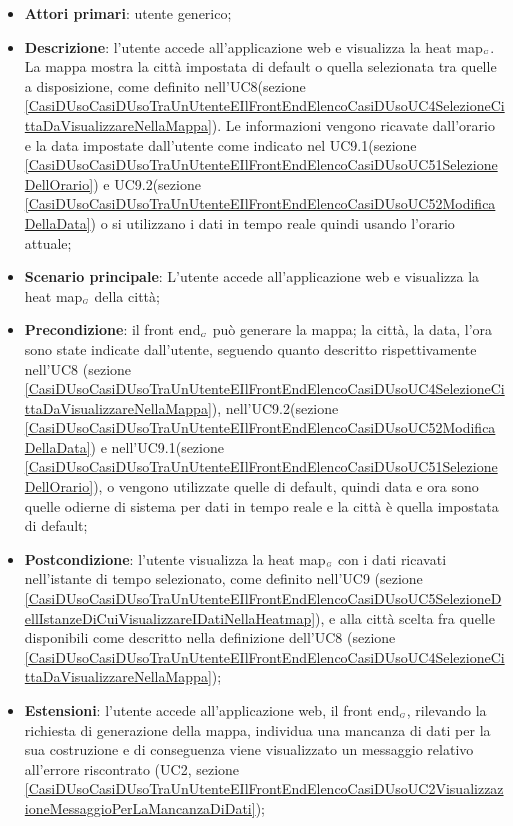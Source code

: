 \begin{itemize}
	\item \textbf{Attori primari}: utente generico;
	\item \textbf{Descrizione}: l’utente accede all’applicazione web e visualizza la heat map$_{\scaleto{G}{3pt}}$. La mappa mostra la città impostata di default o quella selezionata tra quelle a disposizione, come definito nell’UC8(sezione \ref{CasiDUsoCasiDUsoTraUnUtenteEIlFrontEndElencoCasiDUsoUC4SelezioneCittaDaVisualizzareNellaMappa}). Le informazioni vengono ricavate dall’orario e la data impostate dall’utente come indicato nel UC9.1(sezione \ref{CasiDUsoCasiDUsoTraUnUtenteEIlFrontEndElencoCasiDUsoUC51SelezioneDellOrario}) e UC9.2(sezione \ref{CasiDUsoCasiDUsoTraUnUtenteEIlFrontEndElencoCasiDUsoUC52ModificaDellaData}) o si utilizzano i dati in tempo reale quindi usando l’orario attuale;
	\item \textbf{Scenario principale}: L’utente accede all’applicazione web e visualizza la heat map$_{\scaleto{G}{3pt}}$ della città;
	\item \textbf{Precondizione}: il front end$_{\scaleto{G}{3pt}}$ può generare la mappa; la città, la data, l’ora sono state indicate dall’utente, seguendo quanto descritto rispettivamente nell'UC8 (sezione \ref{CasiDUsoCasiDUsoTraUnUtenteEIlFrontEndElencoCasiDUsoUC4SelezioneCittaDaVisualizzareNellaMappa}), nell'UC9.2(sezione \ref{CasiDUsoCasiDUsoTraUnUtenteEIlFrontEndElencoCasiDUsoUC52ModificaDellaData}) e nell'UC9.1(sezione \ref{CasiDUsoCasiDUsoTraUnUtenteEIlFrontEndElencoCasiDUsoUC51SelezioneDellOrario}), o vengono utilizzate quelle di default, quindi data e ora sono quelle odierne di sistema per dati in tempo reale e la città è quella impostata di default;
	\item \textbf{Postcondizione}: l’utente visualizza la heat map$_{\scaleto{G}{3pt}}$ con i dati ricavati nell’istante di tempo selezionato, come definito nell’UC9 (sezione \ref{CasiDUsoCasiDUsoTraUnUtenteEIlFrontEndElencoCasiDUsoUC5SelezioneDellIstanzeDiCuiVisualizzareIDatiNellaHeatmap}), e alla città scelta fra quelle disponibili come descritto nella definizione dell’UC8 (sezione \ref{CasiDUsoCasiDUsoTraUnUtenteEIlFrontEndElencoCasiDUsoUC4SelezioneCittaDaVisualizzareNellaMappa});
	\item \textbf{Estensioni}: l’utente accede all’applicazione web, il front end$_{\scaleto{G}{3pt}}$, rilevando la richiesta di generazione della mappa, individua una mancanza di dati per la sua costruzione e di conseguenza viene visualizzato un messaggio relativo all’errore riscontrato (UC2, sezione \ref{CasiDUsoCasiDUsoTraUnUtenteEIlFrontEndElencoCasiDUsoUC2VisualizzazioneMessaggioPerLaMancanzaDiDati});
\end{itemize}


